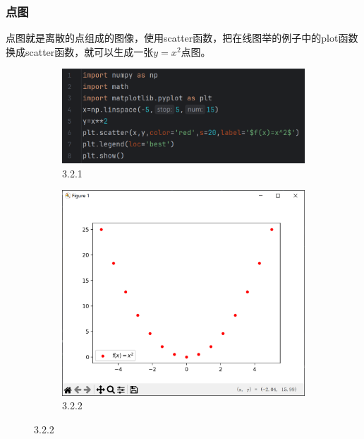 \documentclass[12pt]{article}
\begin{document}
\subsubsection{点图}
点图就是离散的点组成的图像，使用scatter函数，把在线图举的例子中的plot函数换成scatter函数，就可以生成一张\(y=x^2\)点图。
\begin{figure}[H]
    \centering
    \begin{subfigure}[b]{0.45\textwidth}
        \includegraphics[width=1.3\textwidth,height=0.6\textwidth]{点图program1.png}
        \caption{3.2.1}
        \label{fig:enter-label-1}
    \end{subfigure}
    \hfill        
    \begin{subfigure}[b]{0.4\textwidth}
        \includegraphics[width=\textwidth]{点图Pic1.png}
        \caption{3.2.2}
        \label{fig:enter-label-2}
    \end{subfigure}
\end{figure}
\end{document}

